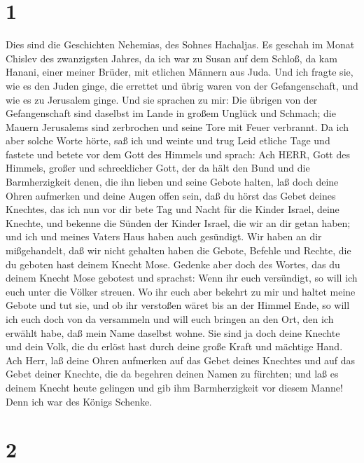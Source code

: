 \hypertarget{section}{%
\section{1}\label{section}}

 Dies sind die Geschichten Nehemias, des Sohnes Hachaljas.
Es geschah im Monat Chislev des zwanzigsten Jahres, da ich war zu Susan
auf dem Schloß,  da kam Hanani, einer meiner Brüder, mit
etlichen Männern aus Juda. Und ich fragte sie, wie es den Juden ginge,
die errettet und übrig waren von der Gefangenschaft, und wie es zu
Jerusalem ginge.  Und sie sprachen zu mir: Die übrigen von
der Gefangenschaft sind daselbst im Lande in großem Unglück und Schmach;
die Mauern Jerusalems sind zerbrochen und seine Tore mit Feuer
verbrannt.  Da ich aber solche Worte hörte, saß ich und
weinte und trug Leid etliche Tage und fastete und betete vor dem Gott
des Himmels  und sprach: Ach HERR, Gott des Himmels, großer
und schrecklicher Gott, der da hält den Bund und die Barmherzigkeit
denen, die ihn lieben und seine Gebote halten,  laß doch
deine Ohren aufmerken und deine Augen offen sein, daß du hörst das Gebet
deines Knechtes, das ich nun vor dir bete Tag und Nacht für die Kinder
Israel, deine Knechte, und bekenne die Sünden der Kinder Israel, die wir
an dir getan haben; und ich und meines Vaters Haus haben auch gesündigt.
 Wir haben an dir mißgehandelt, daß wir nicht gehalten haben
die Gebote, Befehle und Rechte, die du geboten hast deinem Knecht Mose.
 Gedenke aber doch des Wortes, das du deinem Knecht Mose
gebotest und sprachst: Wenn ihr euch versündigt, so will ich euch unter
die Völker streuen.  Wo ihr euch aber bekehrt zu mir und
haltet meine Gebote und tut sie, und ob ihr verstoßen wäret bis an der
Himmel Ende, so will ich euch doch von da versammeln und will euch
bringen an den Ort, den ich erwählt habe, daß mein Name daselbst wohne.
 Sie sind ja doch deine Knechte und dein Volk, die du
erlöst hast durch deine große Kraft und mächtige Hand.  Ach
Herr, laß deine Ohren aufmerken auf das Gebet deines Knechtes und auf
das Gebet deiner Knechte, die da begehren deinen Namen zu fürchten; und
laß es deinem Knecht heute gelingen und gib ihm Barmherzigkeit vor
diesem Manne! Denn ich war des Königs Schenke.

\hypertarget{section-1}{%
\section{2}\label{section-1}}

